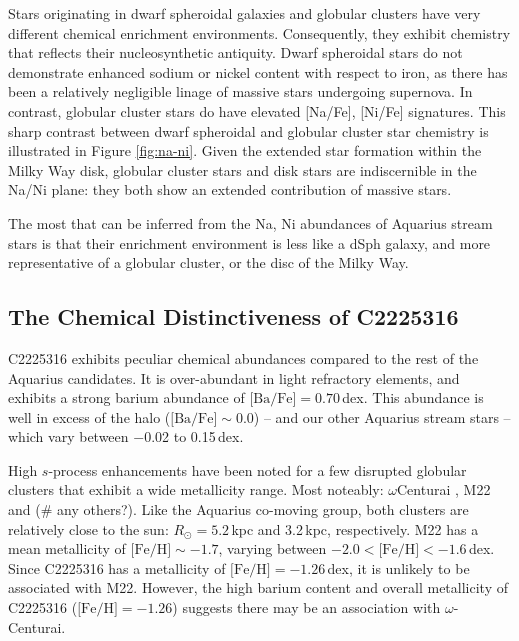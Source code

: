 \documentclass{emulateapj}
\begin{document}
Stars originating in dwarf spheroidal galaxies and globular clusters have very different chemical enrichment environments. Consequently, they exhibit chemistry that reflects their nucleosynthetic antiquity. Dwarf spheroidal stars do not demonstrate enhanced sodium or nickel content with respect to iron, as there has been a relatively negligible linage of massive stars undergoing supernova. In contrast, globular cluster stars do have elevated [Na/Fe], [Ni/Fe] signatures. This sharp contrast between dwarf spheroidal and globular cluster star chemistry is illustrated in Figure \ref{fig:na-ni}. Given the extended star formation within the Milky Way disk, globular cluster stars and disk stars are indiscernible in the Na/Ni plane: they both show an extended contribution of massive stars. 

The most that can be inferred from the Na, Ni abundances of Aquarius stream stars is that their enrichment environment is less like a dSph galaxy, and more representative of a globular cluster, or the disc of the Milky Way. 



\subsection{The Chemical Distinctiveness of C2225316}


C2225316 exhibits peculiar chemical abundances compared to the rest of the Aquarius candidates. It is over-abundant in light refractory elements, and exhibits a strong barium abundance of $\mbox{[Ba/Fe]} = 0.70$\,dex. This abundance is well in excess of the halo ($\mbox{[Ba/Fe]} \sim 0.0$) \--- and our other Aquarius stream stars \--- which vary between $-$0.02 to 0.15\,dex.

High $s$-process enhancements have been noted for a few disrupted globular clusters that exhibit a wide metallicity range. Most noteably: $\omega$Centurai \citep{majewski;et-al_2012}, M22 \citep{marinolet-al_2011} and (\# any others?). Like the Aquarius co-moving group, both clusters are relatively close to the sun: $R_\odot = 5.2$\,kpc and 3.2\,kpc, respectively. M22 has a mean metallicity of $\mbox{[Fe/H]} \sim -1.7$, varying between $-2.0 < \mbox{[Fe/H]} < -1.6$\,dex. Since C2225316 has a metallicity of $\mbox{[Fe/H]} = -1.26$\,dex, it is unlikely to be associated with M22. However, the high barium content and overall metallicity of C2225316 ($\mbox{[Fe/H]} = -1.26$) suggests there may be an association with $\omega$-Centurai.
\end{document}
